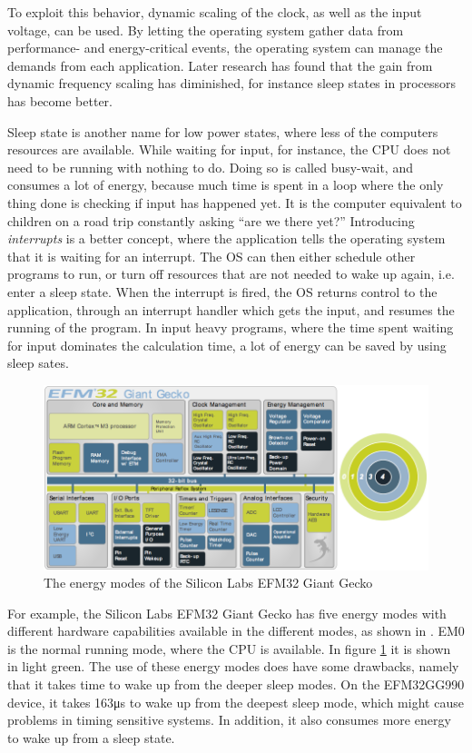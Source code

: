 To exploit this behavior, dynamic scaling of the clock, as well as the input voltage, can be used.
By letting the operating system gather data from performance- and energy-critical events, the operating system can manage the demands from each application. \citep{Weissel2002}
Later research has found that the gain from dynamic frequency scaling has diminished, for instance sleep states in processors has become better.\citep{lesuer2010}

Sleep state is another name for low power states, where less of the computers resources are available.
While waiting for input, for instance, the CPU does not need to be running with nothing to do.
Doing so is called busy-wait, and consumes a lot of energy, because much time is spent in a loop where the only thing done is checking if input has happened yet.
It is the computer equivalent to children on a road trip constantly asking ``are we there yet?''
Introducing \emph{interrupts} is a better concept, where the application tells the operating system that it is waiting for an interrupt.
The OS can then either schedule other programs to run, or turn off resources that are not needed to wake up again, i.e. enter a sleep state.
When the interrupt is fired, the OS returns control to the application, through an interrupt handler which gets the input, and resumes the running of the program.
In input heavy programs, where the time spent waiting for input dominates the calculation time, a lot of energy can be saved by using sleep sates.

\begin{figure}[h!]
\centering
\includegraphics[scale=0.4]{fig/pics/EFM32EM.png}
\caption{The energy modes of the Silicon Labs EFM32 Giant Gecko}
\label{fig:efm32em}
\end{figure}

For example, the Silicon Labs EFM32 Giant Gecko has five energy modes with different hardware capabilities available in the different modes, as shown in .
EM0 is the normal running mode, where the CPU is available.
In figure \ref{fig:efm32em} it is shown in light green.
The use of these energy modes does have some drawbacks, namely that it takes time to wake up from the deeper sleep modes.
On the EFM32GG990 device, it takes 163\si{\micro\second} to wake up from the deepest sleep mode, which might cause problems in timing sensitive systems.
In addition, it also consumes more energy to wake up from a sleep state.

